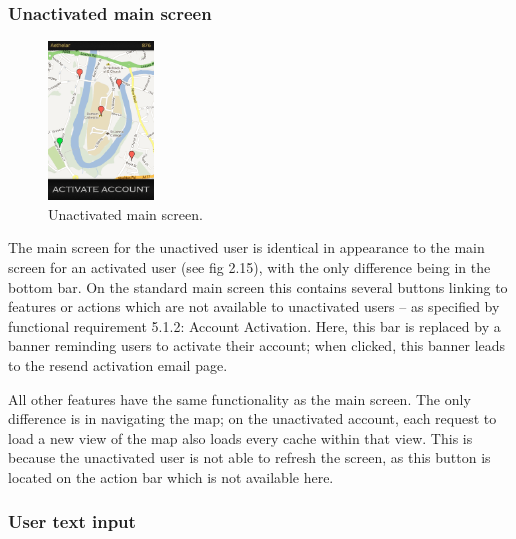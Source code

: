 \subsubsection{Unactivated main screen}

\begin{figure}
	\vspace{-50pt}
	\begin{center}
	\includegraphics[width=0.25\textwidth]{images/unauthorised_main_mockup}
	\caption{Unactivated main screen.}
	\label{unactivated_main}
	\end{center}
	\vspace{-50pt}
\end{figure}

The main screen for the unactived user is identical in appearance to the main screen for an activated user (see fig 2.15), with the only difference being in the bottom bar. On the standard main screen this contains several buttons linking to features or actions which are not available to unactivated users – as specified by functional requirement 5.1.2: Account Activation. Here, this bar is replaced by a banner reminding users to activate their account; when clicked, this banner leads to the resend activation email page.

All other features have the same functionality as the main screen. The only difference is in navigating the map; on the unactivated account, each request to load a new view of the map also loads every cache within that view. This is because the unactivated user is not able to refresh the screen, as this button is located on the action bar which is not available here.

\subsubsection{User text input}

